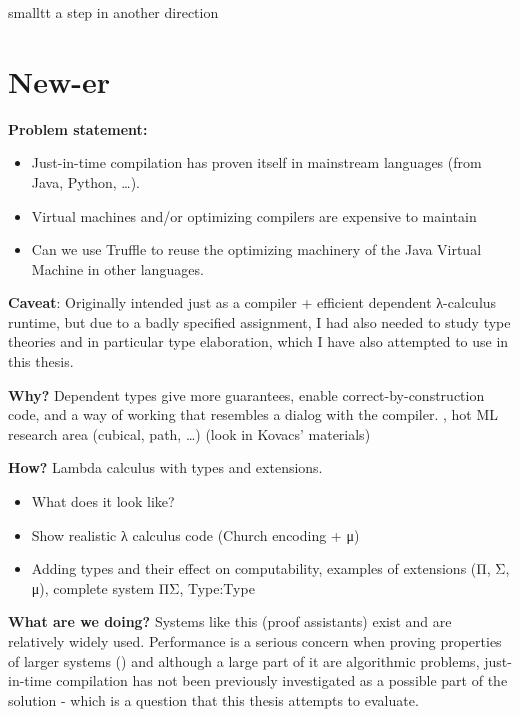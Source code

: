 \documentclass[english,zadani,odsaz]{fitthesis}
\begin{document}

smalltt a step in another direction

\section{New-er}
\label{sec:org0b5024f}
\textbf{Problem statement:}
\begin{itemize}
\item Just-in-time compilation has proven itself in mainstream languages (from Java, Python, \ldots{}).
\item Virtual machines and/or optimizing compilers are expensive to maintain
\item Can we use Truffle to reuse the optimizing machinery of the Java Virtual
Machine in other languages.
\end{itemize}

\textbf{Caveat}: Originally intended just as a compiler + efficient dependent λ-calculus
runtime, but due to a badly specified assignment, I had also needed to study
type theories and in particular type elaboration, which I have also attempted to
use in this thesis.

\textbf{Why?} Dependent types give more guarantees, enable correct-by-construction code,
and a way of working that resembles a dialog with the compiler. , hot ML research area (cubical, path, \ldots{}) (look in Kovacs' materials)

\textbf{How?} Lambda calculus with types and extensions.
\begin{itemize}
\item What does it look like?
\item Show realistic λ calculus code (Church encoding + μ)
\item Adding types and their effect on computability, examples of extensions (Π, Σ,
μ), complete system ΠΣ, Type:Type
\end{itemize}

\textbf{What are we doing?} Systems like this (proof assistants) exist and are relatively
widely used. Performance is a serious concern when proving properties of larger
systems () and although a large part of it are
algorithmic problems, just-in-time compilation has not been previously
investigated as a possible part of the solution - which is a question that this
thesis attempts to evaluate.
\end{document}
